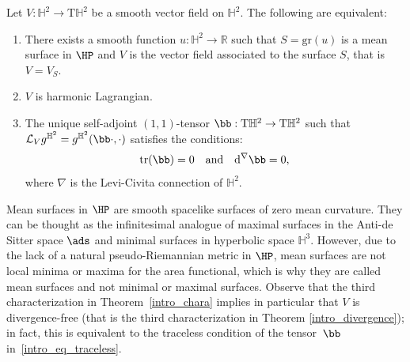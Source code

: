 \begin{theorem}\label{intro_chara}
Let \(V: \mathbb{H}^2 \to \mathrm{T}\mathbb{H}^2\) be a smooth vector field on \(\mathbb{H}^2\). The following are equivalent:
\begin{enumerate}
\item There exists a smooth function \(u: \mathbb{H}^2 \to \mathbb{R}\) such that \(S=\mathrm{gr}(u)\) is a mean surface in \(\HP\) and \(V\) is the vector field associated to the surface \(S\), that is \(V = V_S\).
\item \(V\) is harmonic Lagrangian.
\item The unique self-adjoint \((1, 1)\)-tensor \(\bb: \mathrm{T}\mathbb{H}^2 \to \mathrm{T}\mathbb{H}^2\) such that \(\mathcal{L}_V g^{\mathbb{H}^2} = g^{\mathbb{H}^2}(\bb \cdot, \cdot)\) satisfies the conditions:
\begin{equation}\label{intro_eq_traceless}
\mathrm{tr}(\bb) = 0 \quad \text{and} \quad \mathrm{d}^{\nabla} \bb = 0,
\end{equation}
where \(\nabla\) is the Levi-Civita connection of \(\mathbb{H}^2\).
\end{enumerate}
\end{theorem}
Mean surfaces in \(\HP\) are smooth spacelike surfaces of zero mean curvature. They can be thought as the infinitesimal analogue of maximal surfaces in the Anti-de Sitter space \(\ads\) and minimal surfaces in hyperbolic space $\mathbb{H}^3$. However, due to the lack of a natural pseudo-Riemannian metric in \(\HP\), mean surfaces are not local minima or maxima for the area functional, which is why they are called mean surfaces and not minimal or maximal surfaces. Observe that the third characterization in Theorem~\ref{intro_chara} implies in particular that \(V\) is divergence-free (that is the third characterization in Theorem \ref{intro_divergence}); in fact, this is equivalent to the traceless condition of the tensor~\(\bb\) in~\eqref{intro_eq_traceless}.

